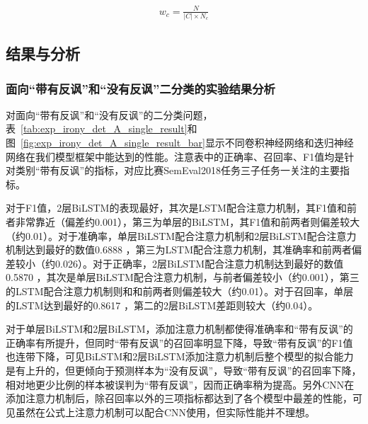 \begin{align}
    \label{eq:class_weight}
    w_c = \frac{N}{|C| \times N_c}
\end{align}

\subsection{结果与分析}

\subsubsection{面向“带有反讽”和“没有反讽”二分类的实验结果分析}

对面向“带有反讽”和“没有反讽”的二分类问题，表~\ref{tab:exp_irony_det_A_single_result}和图~\ref{fig:exp_irony_det_A_single_result_bar}显示不同卷积神经网络和迭归神经网络在我们模型框架中能达到的性能。注意表中的正确率、召回率、F1值均是针对类别“带有反讽”的指标，对应比赛SemEval2018任务三子任务一关注的主要指标。

对于F1值，2层BiLSTM的表现最好，其次是LSTM配合注意力机制，其F1值和前者非常靠近（偏差约0.001），第三为单层的BiLSTM，其F1值和前两者则偏差较大（约0.01）。对于准确率，单层BiLSTM配合注意力机制和2层BiLSTM配合注意力机制达到最好的数值0.6888 ，第三为LSTM配合注意力机制，其准确率和前两者偏差较小（约0.026）。对于正确率，2层BiLSTM配合注意力机制达到最好的数值0.5870 ，其次是单层BiLSTM配合注意力机制，与前者偏差较小（约0.001），第三的LSTM配合注意力机制则和和前两者则偏差较大（约0.01）。对于召回率，单层的LSTM达到最好的0.8617 ，第二的2层BiLSTM差距则较大（约0.04）。

对于单层BiLSTM和2层BiLSTM，添加注意力机制都使得准确率和“带有反讽”的正确率有所提升，但同时“带有反讽”的召回率明显下降，导致“带有反讽”的F1值也连带下降，可见BiLSTM和2层BiLSTM添加注意力机制后整个模型的拟合能力是有上升的，但更倾向于预测样本为“没有反讽”，导致“带有反讽”的召回率下降，相对地更少比例的样本被误判为“带有反讽”，因而正确率稍为提高。另外CNN在添加注意力机制后，除召回率以外的三项指标都达到了各个模型中最差的性能，可见虽然在公式上注意力机制可以配合CNN使用，但实际性能并不理想。

